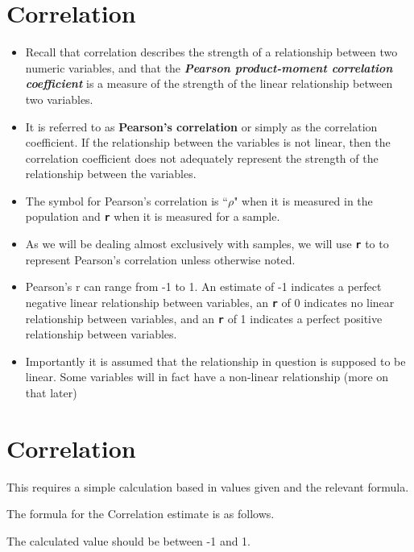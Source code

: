\section*{Correlation}
\begin{itemize}
	\item Recall that correlation describes the strength of a relationship between two numeric variables, and that the \textbf{\textit{Pearson product-moment correlation coefficient}} is a measure of the strength of the linear relationship between two variables.
	
	\item It is referred to as \textbf{Pearson's correlation} or simply as the correlation coefficient. If the relationship between the variables is not linear, then the correlation coefficient does not adequately represent the strength of the relationship between the variables.
	
	\item The symbol for Pearson's correlation is ``$\rho$" when it is measured in the population and \texttt{\textbf{r}} when it is measured for a sample.
	
	\item As we will be dealing almost exclusively with samples, we will use \texttt{\textbf{r}} to to represent Pearson's correlation unless otherwise noted.
	
	\item Pearson's r can range from -1 to 1. An estimate of -1 indicates a perfect negative linear relationship between variables, an \texttt{\textbf{r}} of 0 indicates no linear relationship between variables, and an \texttt{\textbf{r}} of 1 indicates a perfect positive relationship between variables.
	
	\item Importantly it is assumed that the relationship in question is supposed to be linear. Some variables will in fact have a non-linear relationship (more on that later)
\end{itemize}

\section{Correlation}

This requires a simple calculation based in values given and the relevant formula.

The formula for the Correlation estimate is as follows.

The calculated value should be between -1 and 1.

